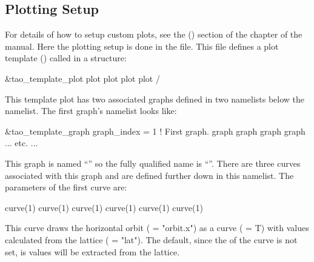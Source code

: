 \documentclass{hitec}     %
\begin{document}
{%
\subsection{Plotting Setup}
\label{s:twiss.plot}

For details of how to setup custom plots, see the 
() section of the  chapter of the \tao manual.  Here
the plotting setup is done in the  file. This file defines a plot template
() called  in a  structure:
\begin{code}
&tao_template_plot
  plot%
  plot%
  plot%
  plot%
/
\end{code}
This template plot has two associated graphs defined in two  namelists below
the  namelist. The first graph's namelist looks like:
\begin{code}
&tao_template_graph
  graph_index = 1               ! First graph.
  graph%
  graph%
  graph%
  graph%
  ... etc. ...
\end{code}
This graph is named ``'' so the fully qualified name is ``''. There are
three curves associated with this graph and are defined further down in this namelist. The
parameters of the first curve are:
\begin{code}
  curve(1)%
  curve(1)%
  curve(1)%
  curve(1)%
  curve(1)%
  curve(1)%
\end{code}
This curve draws the horizontal orbit ( = "orbit.x") as a curve ( = T)
with values calculated from the lattice ( = "lat"). The default, since the
 of the curve is not set, is values will be extracted from the  lattice.

}
\end{document}
